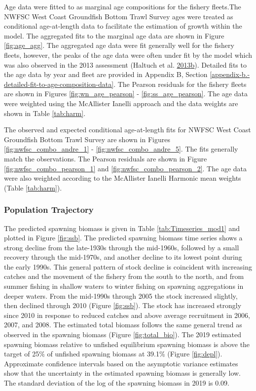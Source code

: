 \documentclass[12pt,]{article}
\begin{document}
Age data were fitted to as marginal age compositions for the fishery
fleets.The NWFSC West Coast Groundfish Bottom Trawl Survey ages were
treated as conditional age-at-length data to facilitate the estimation
of growth within the model. The aggregated fits to the marginal age data
are shown in Figure \ref{fig:age_agg}. The aggregated age data were fit
generally well for the fishery fleets, however, the peaks of the age
data were often under fit by the model which was also observed in the
2013 assessment (Haltuch et al.
\protect\hyperlink{ref-haltuch_status_2013}{2013}\protect\hyperlink{ref-haltuch_status_2013}{b}).
Detailed fits to the age data by year and fleet are provided in Appendix
B, Section \ref{appendix-b.-detailed-fit-to-age-composition-data}. The
Pearson residuals for the fishery fleets are shown in Figures
\ref{fig:wn_age_pearson} - \ref{fig:ss_age_pearson}. The age data were
weighted using the McAllister Ianelli approach and the data weights are
shown in Table \ref{tab:harm}.

The observed and expected conditional age-at-length fits for NWFSC West
Coast Groundfish Bottom Trawl Survey are shown in Figures
\ref{fig:nwfsc_combo_andre_1} - \ref{fig:nwfsc_combo_andre_5}. The fits
generally match the observations. The Pearson residuals are shown in
Figure \ref{fig:nwfsc_combo_pearson_1} and
\ref{fig:nwfsc_combo_pearson_2}. The age data were also weighted
according to the McAllister Ianelli Harmonic mean weights (Table
\ref{tab:harm}).

\subsubsection{Population Trajectory}\label{population-trajectory}

The predicted spawning biomass is given in Table
\ref{tab:Timeseries_mod1} and plotted in Figure \ref{fig:ssb}. The
predicted spawning biomass time series shows a strong decline from the
late-1930s through the mid-1960s, followed by a small recovery through
the mid-1970s, and another decline to its lowest point during the early
1990s. This general pattern of stock decline is coincident with
increasing catches and the movement of the fishery from the south to the
north, and from summer fishing in shallow waters to winter fishing on
spawning aggregations in deeper waters. From the mid-1990s through 2005
the stock increased slightly, then declined through 2010 (Figure
\ref{fig:ssb}). The stock has increased strongly since 2010 in response
to reduced catches and above average recruitment in 2006, 2007, and
2008. The estimated total biomass follows the same general trend as
observed in the spawning biomass (Figure \ref{fig:total_bio}). The 2019
estimated spawning biomass relative to unfished equilibrium spawning
biomass is above the target of 25\% of unfished spawning biomass at
39.1\% (Figure \ref{fig:depl}). Approximate confidence intervals based
on the asymptotic variance estimates show that the uncertainty in the
estimated spawning biomass is generally low. The standard deviation of
the log of the spawning biomass in 2019 is 0.09.
\end{document}
